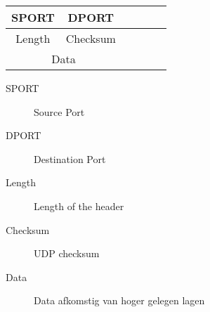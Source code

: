 
\begin{tabular}{ |c|c|c|c|c|c| }
\hline
	SPORT & DPORT \\
\hline
	Length & Checksum \\
\hline
	\multicolumn{2}{|c|}{Data} \\
\hline
\end{tabular}

\begin{description}
	\item[SPORT] Source Port
	\item[DPORT] Destination Port
	\item[Length] Length of the header
	\item[Checksum] UDP checksum
	\item[Data] Data afkomstig van hoger gelegen lagen
\end{description}

